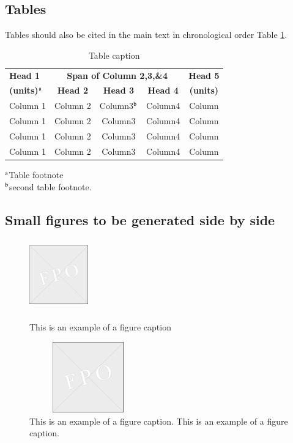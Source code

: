 \documentclass{isabec} %
\begin{document}
\subsection{Tables}
Tables should also be cited in the main text in chronological order Table \ref{tab1}.

\begin{table}[h]
\caption{Table caption}
\label{tab1}
\centering
\begin{tabular}{@{}lcccc@{}}
\textbf{Head 1} &\multicolumn{3}{c}{{\bf Span of Column 2,3,\&4}}&\textbf{Head 5}\\
\textbf{{(}units)$^{\rm a}$} &\textbf{Head 2} &\textbf{Head 3} &\textbf{Head 4} &\textbf{{(}units)}\\[6pt]
Column 1 &Column 2 &Column3$^{\rm b}$ &Column4 &Column\\
Column 1 &Column 2 &Column3 &Column4 &Column\\
Column 1 &Column 2 &Column3 &Column4 &Column\\
Column 1 &Column 2 &Column3 &Column4 &Column\\
\end{tabular}
\begin{tabnote}
$^{\rm a}$Table footnote\\ $^{\rm b}$second table footnote.
\end{tabnote}
\end{table}

\pagebreak

\subsection{Small figures to be generated side by side}
\begin{figure}[h]
\centering
\begin{minipage}[b]{.45\textwidth}
\centering
\includegraphics[width=1in,height=1.2in]{fpo}%
\caption{ This is an example of a figure caption}\label{fig2}
\end{minipage}\hfill
%
\begin{minipage}[b]{.45\textwidth}
\centering
 \includegraphics[width=2in,height=1.2in]{fpo}%
 \caption{This is an example of a figure caption. This is an example of a figure caption.}\label{fig3}
\end{minipage}
\end{figure}
\end{document}
